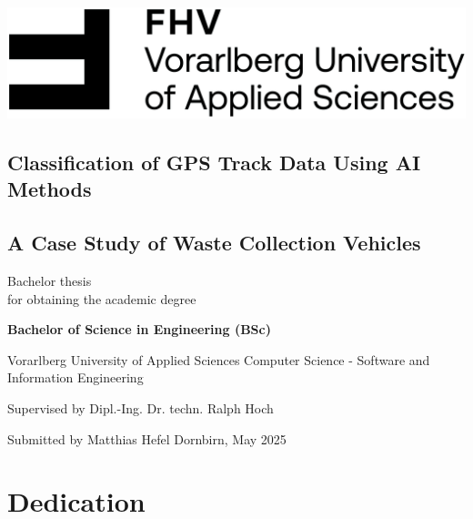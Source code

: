 \documentclass[a4paper,12pt,twoside]{scrreprt}
\begin{document}
\cleardoublepage   %
\thispagestyle{empty}
\begin{titlepage}
  \begin{flushright}
    \includegraphics[width=0.4\linewidth]{Abbildungen/Wort-Bild-Marke-cmyk}
  \end{flushright}
  \begin{flushleft}
    \section*{Classification of GPS Track Data Using AI Methods}
    \subsection*{A Case Study of Waste Collection Vehicles}
    \vspace{1cm}

    Bachelor thesis\\
    for obtaining the academic degree
    \vspace{0.5cm}

    \textbf{Bachelor of Science in Engineering (BSc)}

    \vspace{1cm}
    Vorarlberg University of Applied Sciences\newline
    Computer Science - Software and Information Engineering

    \vspace{0.5cm}

    Supervised by\newline
    Dipl.-Ing. Dr. techn. Ralph Hoch

    \vspace{0.5cm}

    Submitted by\newline
    Matthias Hefel\newline
    Dornbirn, May 2025
  \end{flushleft}
\end{titlepage}

\newpage

\section*{Dedication}
\end{document}
